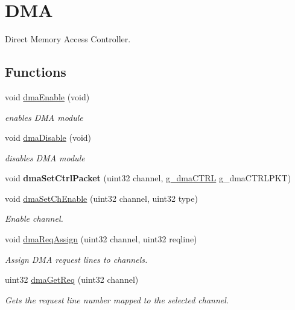 \hypertarget{group__DMA}{}\section{D\+MA}
\label{group__DMA}


Direct Memory Access Controller.  


\subsection*{Functions}
\begin{DoxyCompactItemize}
\item 
void \mbox{\hyperlink{group__DMA_ga075cb5440673bd8e8a85d24c1c724a84}{dma\+Enable}} (void)
\begin{DoxyCompactList}\small\item\em enables D\+MA module \end{DoxyCompactList}\item 
void \mbox{\hyperlink{group__DMA_gab24991421023d51480c1187f9cd24df7}{dma\+Disable}} (void)
\begin{DoxyCompactList}\small\item\em disables D\+MA module \end{DoxyCompactList}\item 
\mbox{\label{group__DMA_gad610e819df740800ae29b9b85c8920a9}} 
void {\bfseries dma\+Set\+Ctrl\+Packet} (uint32 channel, \mbox{\hyperlink{structg__dmaCTRL}{g\+\_\+dma\+C\+T\+RL}} g\+\_\+dma\+C\+T\+R\+L\+P\+KT)
\item 
void \mbox{\hyperlink{group__DMA_ga4d2728f13e513154152332fdeab27135}{dma\+Set\+Ch\+Enable}} (uint32 channel, uint32 type)
\begin{DoxyCompactList}\small\item\em Enable channel. \end{DoxyCompactList}\item 
void \mbox{\hyperlink{group__DMA_ga9faf7aff978b3725f8554831af92f49e}{dma\+Req\+Assign}} (uint32 channel, uint32 reqline)
\begin{DoxyCompactList}\small\item\em Assign D\+MA request lines to channels. \end{DoxyCompactList}\item 
uint32 \mbox{\hyperlink{group__DMA_ga0fd24f134d8c414943021de657a37a86}{dma\+Get\+Req}} (uint32 channel)
\begin{DoxyCompactList}\small\item\em Gets the request line number mapped to the selected channel. \end{DoxyCompactList}\item 

\end{DoxyCompactItemize}
